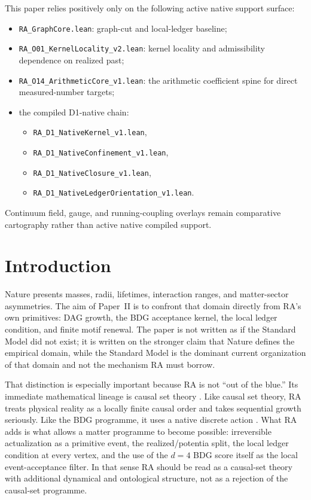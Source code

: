\documentclass[11pt]{article}
\begin{document}
\begin{tcolorbox}[title=Active Native Support Surface Used Positively,colback=gray!5,colframe=gray!60]
This paper relies positively only on the following active native support surface:
\begin{itemize}[nosep]
    \item \texttt{RA\_GraphCore.lean}: graph-cut and local-ledger baseline;
    \item \texttt{RA\_O01\_KernelLocality\_v2.lean}: kernel locality and admissibility dependence on realized past;
    \item \texttt{RA\_O14\_ArithmeticCore\_v1.lean}: the arithmetic coefficient spine for direct measured-number targets;
    \item the compiled D1-native chain:
    \begin{itemize}[nosep]
        \item \texttt{RA\_D1\_NativeKernel\_v1.lean},
        \item \texttt{RA\_D1\_NativeConfinement\_v1.lean},
        \item \texttt{RA\_D1\_NativeClosure\_v1.lean},
        \item \texttt{RA\_D1\_NativeLedgerOrientation\_v1.lean}.
    \end{itemize}
\end{itemize}
Continuum field, gauge, and running-coupling overlays remain comparative cartography rather than active native compiled support.
\end{tcolorbox}


\section{Introduction}

Nature presents masses, radii, lifetimes, interaction ranges, and matter-sector asymmetries. The aim of Paper~II is to confront that domain directly from RA's own primitives: DAG growth, the BDG acceptance kernel, the local ledger condition, and finite motif renewal. The paper is not written as if the Standard Model did not exist; it is written on the stronger claim that Nature defines the empirical domain, while the Standard Model is the dominant current organization of that domain and not the mechanism RA must borrow.

That distinction is especially important because RA is not ``out of the blue.'' Its immediate mathematical lineage is causal set theory \cite{Bombelli1987,Sorkin1997,Rideout2000}. Like causal set theory, RA treats physical reality as a locally finite causal order and takes sequential growth seriously. Like the BDG programme, it uses a native discrete action \cite{Benincasa2010,Dowker2013}. What RA adds is what allows a matter programme to become possible: irreversible actualization as a primitive event, the realized/potentia split, the local ledger condition at every vertex, and the use of the $d=4$ BDG score itself as the local event-acceptance filter. In that sense RA should be read as a causal-set theory with additional dynamical and ontological structure, not as a rejection of the causal-set programme.
\end{document}
